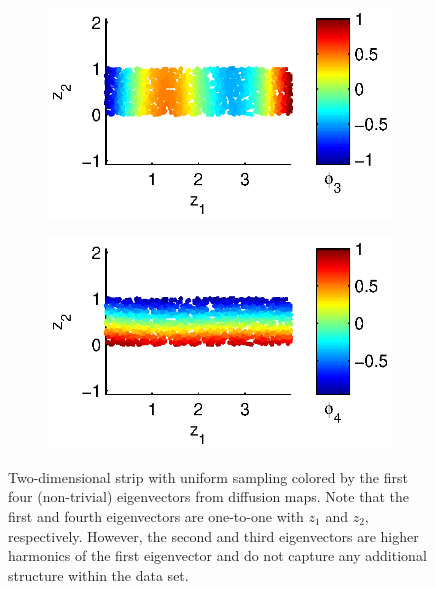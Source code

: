 \documentclass[preprint]{elsarticle}
\begin{document}
\begin{figure}[t]
\begin{subfigure}{0.5\textwidth}
\includegraphics[width=\textwidth]{strip_discrete3}
\end{subfigure}
\begin{subfigure}{0.5\textwidth}
\includegraphics[width=\textwidth]{strip_discrete4}
\end{subfigure}
\caption{ Two-dimensional strip with uniform sampling colored by the first four (non-trivial) eigenvectors from diffusion maps. Note that the first and fourth eigenvectors are one-to-one with $z_1$ and $z_2$, respectively. However, the second and third eigenvectors are higher harmonics of the first eigenvector and do not capture any additional structure within the data set. }
\label{fig:strip_harmonics}
\end{figure}
\end{document}
